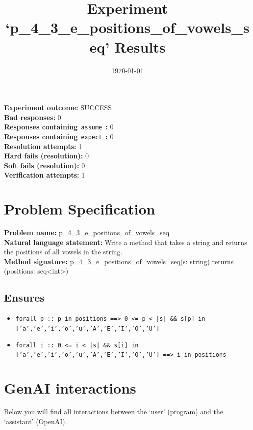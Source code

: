 \documentclass{article}
\begin{document}
\title{Experiment `p\_4\_3\_e\_positions\_of\_vowels\_seq' Results}
\author{\today}
\date{}
\maketitle
\textbf{Experiment outcome: }SUCCESS
\\\textbf{Bad responses: }0
\\\textbf{Responses containing}~\texttt{assume}~\textbf{: }0
\\\textbf{Responses containing}~\texttt{expect}~\textbf{: }0
\\\textbf{Resolution attempts: }1
\\\textbf{Hard fails (resolution): }0
\\\textbf{Soft fails (resolution): }0
\\\textbf{Verification attempts: }1
\section*{Problem Specification}
\textbf{Problem name: }p\_4\_3\_e\_positions\_of\_vowels\_seq
\\\textbf{Natural language statement: }Write a method that takes a string and returns the positions of all vowels in the string.
\\\textbf{Method signature: }p\_4\_3\_e\_positions\_of\_vowels\_seq(s: string) returns (positions: seq<int>)
\subsection*{Ensures}
\begin{itemize}
\item \texttt{forall p :: p in positions ==> 0 <= p < |s| \&\& s[p] in ['a','e','i','o','u','A','E','I','O','U']}
\item \texttt{forall i :: 0 <= i < |s| \&\& s[i] in ['a','e','i','o','u','A','E','I','O','U'] ==> i in positions}
\end{itemize}
\clearpage
\section*{GenAI interactions}
Below you will find all interactions between the `user' (program) and the `assistant' (OpenAI).
\end{document}
